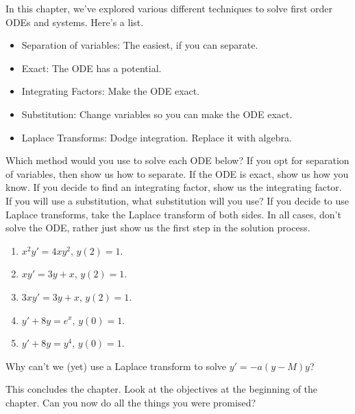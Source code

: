 In this chapter, we've explored various different techniques to solve first order ODEs and systems. Here's a list.
\begin{itemize}
 \item Separation of variables: The easiest, if you can separate.
 \item Exact: The ODE has a potential. 
 \item Integrating Factors: Make the ODE exact.
 \item Substitution: Change variables so you can make the ODE exact.
 \item Laplace Transforms: Dodge integration. Replace it with algebra.
\end{itemize}

\begin{problem}
 Which method would you use to solve each ODE below? If you opt for separation of variables, then show us how to separate.  If the ODE is exact, show us how you know.  If you decide to find an integrating factor, show us the integrating factor.  If you will use a substitution, what substitution will you use? If you decide to use Laplace transforms, take the Laplace transform of both sides.  In all cases, don't solve the ODE, rather just show us the first step in the solution process.
\begin{enumerate}
 \item $x^2y'=4xy^2$, $y(2)=1$.
 \item $xy'=3y+x$, $y(2)=1$.
 \item $3xy'=3y+x$, $y(2)=1$.
 \item $y'+8y=e^x$, $y(0)=1$.
 \item $y'+8y=y^4$, $y(0)=1$.
\end{enumerate} 
\end{problem}
 
\begin{question}
 Why can't we (yet) use a Laplace transform to solve $y'=-a(y-M)y$?
\end{question}


This concludes the chapter.  Look at the objectives at the beginning of the chapter. Can you now do all the things you were promised? 



